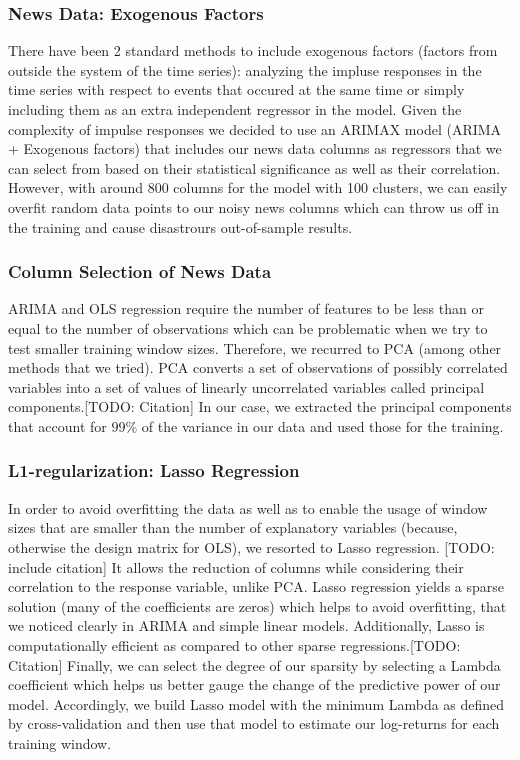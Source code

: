 \subsubsection{News Data: Exogenous Factors}
There have been 2 standard methods to include exogenous factors (factors from outside the system of the time series): analyzing the impluse responses in the time series with respect to events that occured at the same time or simply including them as an extra independent regressor in the model. Given the complexity of impulse responses we decided to use an ARIMAX model (ARIMA + Exogenous factors) that includes our news data columns as regressors that we can select from based on their statistical significance as well as their correlation.
However, with around 800 columns for the model with 100 clusters, we can easily overfit random data points to our noisy news columns which can throw us off in the training and cause disastrours out-of-sample results.
\subsubsection{Column Selection of News Data}
ARIMA and OLS regression require the number of features to be less than or equal to the number of observations which can be problematic when we try to test smaller training window sizes. Therefore, we recurred to PCA (among other methods that we tried). PCA converts a set of observations of possibly correlated variables into a set of values of linearly uncorrelated variables called principal components.[TODO: Citation] In our case, we extracted the principal components that account for $99\%$ of the variance in our data and used those for the training.
\subsubsection{L1-regularization: Lasso Regression}
In order to avoid overfitting the data as well as to enable the usage of window sizes that are smaller than the number of explanatory variables (because, otherwise the design matrix for OLS), we resorted to Lasso regression. [TODO: include citation] It allows the reduction of columns while considering their correlation to the response variable, unlike PCA. Lasso regression yields a sparse solution (many of the coefficients are zeros) which helps to avoid overfitting, that we noticed clearly in ARIMA and simple linear models. Additionally, Lasso is computationally efficient as compared to other sparse regressions.[TODO: Citation] Finally, we can select the degree of our sparsity by selecting a Lambda coefficient which helps us better gauge the change of the predictive power of our model.
Accordingly, we build Lasso model with the minimum Lambda as defined by cross-validation and then use that model to estimate our log-returns for each training window.
